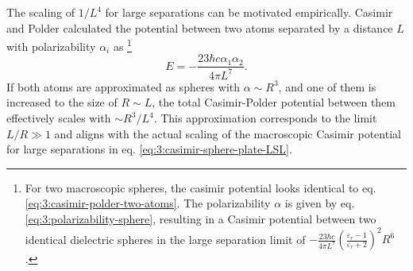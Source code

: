 The scaling of $1/L^4$ for large separations can be motivated empirically. Casimir and Polder calculated the potential between two atoms separated by a distance $L$ with polarizability $\alpha_i$ as \cite{Casimir_1948a} \footnote{For two macroscopic spheres, the casimir potential looks identical to eq. \eqref{eq:3:casimir-polder-two-atoms}. The polarizability $\alpha$ is given by eq. \eqref{eq:3:polarizability-sphere}, resulting in a Casimir potential between two identical dielectric spheres in the large separation limit of $-\frac{23 \hbar c}{4\pi L^7}\left(\frac{\varepsilon_r - 1}{\varepsilon_r + 2}\right)^2R^6$ \cite{Emig_2007}.}
\begin{equation}\label{eq:3:casimir-polder-two-atoms}
  E = -\frac{23 \hbar  c \alpha_1 \alpha_2}{4 \pi L^7} .
\end{equation}
If both atoms are approximated as spheres with $\alpha \sim R^3$, and one of them is increased to the size of $R \sim L$, the total Casimir-Polder potential between them effectively scales with $\sim R^3/L^4$.
This approximation corresponds to the limit $L/R \gg 1$ and aligns with the actual scaling of the macroscopic Casimir potential for large separations in eq. \eqref{eq:3:casimir-sphere-plate-LSL}.

